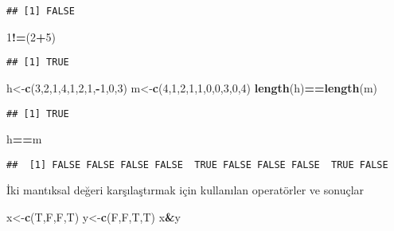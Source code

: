\documentclass[
]{book}
\newenvironment{Shaded}{\begin{snugshade}}{\end{snugshade}}
\newcommand{\DecValTok}[1]{\textcolor[rgb]{0.00,0.00,0.81}{#1}}
\newcommand{\KeywordTok}[1]{\textcolor[rgb]{0.13,0.29,0.53}{\textbf{#1}}}
\newcommand{\NormalTok}[1]{#1}
\newcommand{\OperatorTok}[1]{\textcolor[rgb]{0.81,0.36,0.00}{\textbf{#1}}}
\begin{document}
\begin{verbatim}
## [1] FALSE
\end{verbatim}

\begin{Shaded}
\begin{Highlighting}[]
\DecValTok{1}\OperatorTok{!=}\NormalTok{(}\DecValTok{2}\OperatorTok{+}\DecValTok{5}\NormalTok{)}
\end{Highlighting}
\end{Shaded}

\begin{verbatim}
## [1] TRUE
\end{verbatim}

\begin{Shaded}
\begin{Highlighting}[]
\NormalTok{h<-}\KeywordTok{c}\NormalTok{(}\DecValTok{3}\NormalTok{,}\DecValTok{2}\NormalTok{,}\DecValTok{1}\NormalTok{,}\DecValTok{4}\NormalTok{,}\DecValTok{1}\NormalTok{,}\DecValTok{2}\NormalTok{,}\DecValTok{1}\NormalTok{,}\OperatorTok{-}\DecValTok{1}\NormalTok{,}\DecValTok{0}\NormalTok{,}\DecValTok{3}\NormalTok{)}
\NormalTok{m<-}\KeywordTok{c}\NormalTok{(}\DecValTok{4}\NormalTok{,}\DecValTok{1}\NormalTok{,}\DecValTok{2}\NormalTok{,}\DecValTok{1}\NormalTok{,}\DecValTok{1}\NormalTok{,}\DecValTok{0}\NormalTok{,}\DecValTok{0}\NormalTok{,}\DecValTok{3}\NormalTok{,}\DecValTok{0}\NormalTok{,}\DecValTok{4}\NormalTok{)}
\KeywordTok{length}\NormalTok{(h)}\OperatorTok{==}\KeywordTok{length}\NormalTok{(m)}
\end{Highlighting}
\end{Shaded}

\begin{verbatim}
## [1] TRUE
\end{verbatim}

\begin{Shaded}
\begin{Highlighting}[]
\NormalTok{h}\OperatorTok{==}\NormalTok{m}
\end{Highlighting}
\end{Shaded}

\begin{verbatim}
##  [1] FALSE FALSE FALSE FALSE  TRUE FALSE FALSE FALSE  TRUE FALSE
\end{verbatim}

İki mantıksal değeri karşılaştırmak için kullanılan operatörler ve sonuçlar

\begin{Shaded}
\begin{Highlighting}[]
\NormalTok{x<-}\KeywordTok{c}\NormalTok{(T,F,F,T)}
\NormalTok{y<-}\KeywordTok{c}\NormalTok{(F,F,T,T)}
\NormalTok{x}\OperatorTok{&}\NormalTok{y}
\end{Highlighting}
\end{Shaded}
\end{document}
